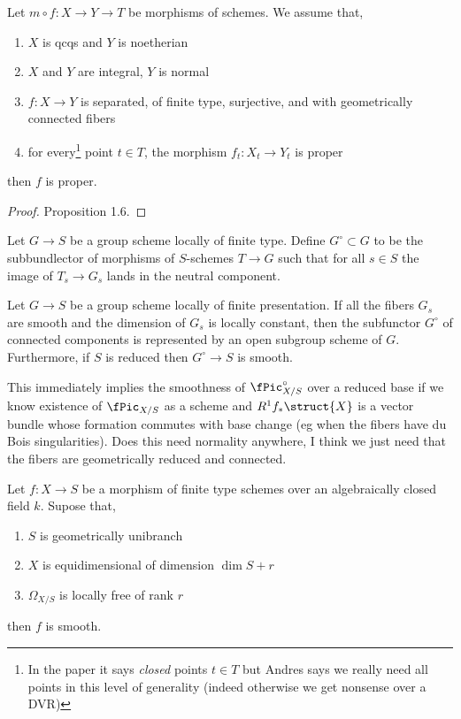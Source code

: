 \documentclass[12pt]{article}
\begin{document}
\begin{prop}
Let $m \circ f : X \to Y \to T$ be morphisms of schemes. We assume that,
\begin{enumerate}
\item $X$ is qcqs and $Y$ is noetherian
\item $X$ and $Y$ are integral, $Y$ is normal
\item $f : X \to Y$ is separated, of finite type, surjective, and with geometrically connected fibers
\item for every\footnote{In the paper it says \textit{closed} points $t \in T$ but Andres says we really need all points in this level of generality (indeed otherwise we get nonsense over a DVR)} point $t \in T$, the morphism $f_t : X_t \to Y_t$ is proper
\end{enumerate}
then $f$ is proper.
\end{prop}

\begin{proof}
 Proposition 1.6.
\end{proof}

\begin{defn}
Let $G \to S$ be a group scheme locally of finite type. Define $G^\circ \subset G$ to be the subbundlector of morphisms of $S$-schemes $T \to G$ such that for all $s \in S$ the image of $T_s \to G_s$ lands in the neutral component.
\end{defn}

\begin{theorem}
Let $G \to S$ be a group scheme locally of finite presentation. If all the fibers $G_s$ are smooth and the dimension of $G_s$ is locally constant, then the subfunctor $G^\circ$ of connected components is represented by an open subgroup scheme of $G$. Furthermore, if $S$ is reduced then $G^\circ \to S$ is smooth.
\end{theorem}

\begin{cor}
This immediately implies the smoothness of $\fPic_{X/S}^\circ$ over a reduced base if we know existence of $\fPic_{X/S}$ as a scheme and $R^1 f_* \struct{X}$ is a vector bundle whose formation commutes with base change (eg when the fibers have du Bois singularities). {\color{red} Does this need normality anywhere, I think we just need that the fibers are geometrically reduced and connected}.
\end{cor}

\begin{theorem}
Let $f : X \to S$ be a morphism of finite type schemes over an algebraically closed field $k$. Supose that,
\begin{enumerate}
\item $S$ is geometrically unibranch
\item $X$ is equidimensional of dimension $\dim{S} + r$
\item $\Omega_{X/S}$ is locally free of rank $r$
\end{enumerate}
then $f$ is smooth.
\end{theorem}
\end{document}
